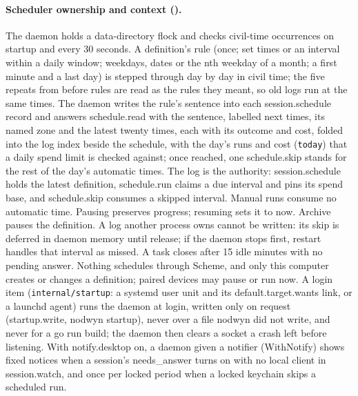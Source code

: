 \paragraph{Scheduler ownership and context ().}
The daemon holds a data-directory flock and checks civil-time occurrences
on startup and every 30 seconds. A definition's rule (once; set times or an
interval within a daily window; weekdays, dates or the nth weekday of a month;
a first minute and a last day) is stepped through day by day in civil time;
the five repeats from before rules are read as the rules they meant, so old
logs run at the same times. The daemon writes the rule's sentence into each
session.schedule record and answers schedule.read with the sentence, labelled
next times, its named zone and the latest twenty times, each with its outcome
and cost, folded into the log index beside the schedule, with the day's runs
and cost (\texttt{today}) that a daily spend limit is checked against; once
reached, one schedule.skip stands for the rest of the day's automatic times. The log is the authority: session.schedule
holds the latest definition, schedule.run claims a due interval and pins its
spend base, and schedule.skip consumes a skipped interval. Manual runs consume
no automatic time. Pausing preserves progress; resuming sets it to now.
Archive pauses the definition. A log another process owns cannot be written:
its skip is deferred in daemon memory until release; if the daemon stops
first, restart handles that interval as missed. A task closes after 15 idle
minutes with no pending answer. Nothing schedules through Scheme, and only
this computer creates or changes a definition; paired devices may pause or
run now. A login item (\texttt{internal/startup}: a systemd user unit and
its default.target.wants link, or a launchd agent) runs the daemon at login,
written only on request (startup.write, nodwyn startup), never over a file
nodwyn did not write, and never for a go run build; the daemon then clears
a socket a crash left before listening. With notify.desktop on, a daemon
given a notifier (WithNotify) shows fixed notices when a session's
needs\_answer turns on with no local client in session.watch, and once per
locked period when a locked keychain skips a scheduled run.

